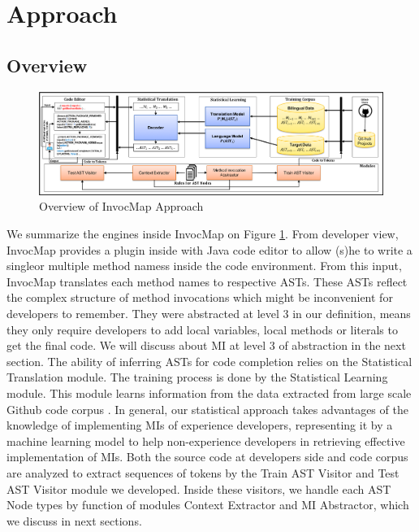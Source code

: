 \section{Approach}
\subsection{Overview}
\begin{figure}[t]
 \centering
  \includegraphics[width=\linewidth]{ApproachOverview.png}
  \caption{Overview of InvocMap Approach}
  \label{fig:ApproachOverview}
\end{figure}
We summarize the engines inside InvocMap on Figure \ref{fig:ApproachOverview}. From developer view, InvocMap provides a plugin inside with Java code editor to allow (s)he to write a singleor multiple method namess inside the code environment. From this input, InvocMap translates each method names to respective ASTs. These ASTs reflect the complex structure of method invocations which might be inconvenient for developers to remember. They were abstracted at level 3 in our definition, means they only require developers to add local variables, local methods or literals to get the final code. We will discuss about MI at level 3 of abstraction in the next section. The ability of inferring ASTs for code completion relies on the Statistical Translation module. The training process is done by the Statistical Learning module. This module learns information from the data extracted from large scale Github code corpus  \cite{id:Github}. In general, our statistical approach takes advantages of the knowledge of implementing MIs of experience developers, representing it by a machine learning model to help non-experience developers in retrieving effective implementation of MIs. Both the source code at developers side and code corpus are analyzed to extract sequences of tokens by the Train AST Visitor and Test AST Visitor module we developed. Inside these visitors, we handle each AST Node types by function of modules Context Extractor and MI Abstractor, which we discuss in next sections.

